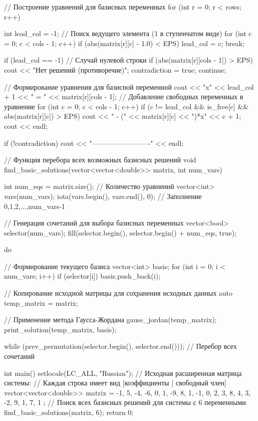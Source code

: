 \documentclass{report}
\begin{document}
\begin{code}
{			// Построение уравнений для базисных переменных
			for (int r = 0; r < rows; r++) {
				int lead_col = -1;
				// Поиск ведущего элемента (1 в ступенчатом виде)
				for (int c = 0; c < cols - 1; c++) {
					if (abs(matrix[r][c] - 1.0) < EPS) {
						lead_col = c;
						break;
					}
				}
				
				if (lead_col == -1) { // Случай нулевой строки
					if (abs(matrix[r][cols - 1]) > EPS) {
						cout << "Нет решений (противоречие)\n";
						contradiction = true;
					}
					continue;
				}
				
				// Формирование уравнения для базисной переменной
				cout << "x" << lead_col + 1 << " = " << matrix[r][cols - 1];
				// Добавление свободных переменных в уравнение
				for (int c = 0; c < cols - 1; c++) {
					if (c != lead_col && is_free[c] && abs(matrix[r][c]) > EPS) {
						cout << " - (" << matrix[r][c] << ")*x" << c + 1;
					}
				}
				cout << endl;
			}
			if (!contradiction) cout << "-------------------------" << endl;
		}
		
		// Функция перебора всех возможных базисных решений
		void find_basic_solutions(vector<vector<double>> matrix, int num_vars) {
			int num_eqs = matrix.size(); // Количество уравнений
			vector<int> vars(num_vars);
			iota(vars.begin(), vars.end(), 0); // Заполнение 0,1,2,...,num_vars-1
			
			// Генерация сочетаний для выбора базисных переменных
			vector<bool> selector(num_vars);
			fill(selector.begin(), selector.begin() + num_eqs, true);
			
			do {
				// Формирование текущего базиса
				vector<int> basis;
				for (int i = 0; i < num_vars; i++) {
					if (selector[i]) basis.push_back(i);
				}
				
				// Копирование исходной матрицы для сохранения исходных данных
				auto temp_matrix = matrix;
				
				// Применение метода Гаусса-Жордана
				gauss_jordan(temp_matrix);
				print_solution(temp_matrix, basis);
				
			} while (prev_permutation(selector.begin(), selector.end())); // Перебор всех сочетаний
		}
		
		int main() {
			setlocale(LC_ALL, "Russian");
			// Исходная расширенная матрица системы:
			// Каждая строка имеет вид [коэффициенты | свободный член]
			vector<vector<double>> matrix = {
				{-1, 5, -4, -6, 0, 1, -9},
				{8, 1, -1, 0, 2, 3, 8},
				{4, 3, -2, 9, 1, 7, 1}
			};
			// Поиск всех базисных решений для системы с 6 переменными
			find_basic_solutions(matrix, 6);
			return 0;
		}
	\end{code}
	
\end{document}
